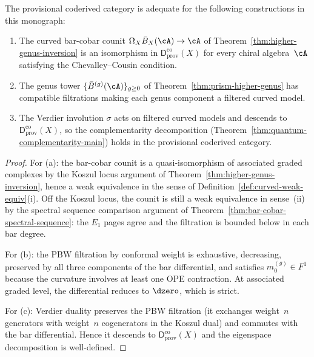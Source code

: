 \begin{proposition}
\label{prop:coderived-adequacy}
The provisional coderived category is adequate for the following
constructions in this monograph:
\begin{enumerate}[label=\textup{(\alph*)}]
\item The curved bar-cobar counit
  $\Omega_X \bar{B}_X(\cA) \to \cA$ of
  Theorem~\textup{\ref{thm:higher-genus-inversion}} is an isomorphism
  in $\mathsf{D}^{\mathrm{co}}_{\mathrm{prov}}(X)$ for every chiral
  algebra~$\cA$ satisfying the Chevalley--Cousin condition.
\item The genus tower $\{\bar{B}^{(g)}(\cA)\}_{g \geq 0}$ of
  Theorem~\textup{\ref{thm:prism-higher-genus}} has compatible
  filtrations making each genus component a filtered curved model.
\item The Verdier involution $\sigma$ acts on filtered curved models
  and descends to $\mathsf{D}^{\mathrm{co}}_{\mathrm{prov}}(X)$,
  so the complementarity decomposition
  \textup{(}Theorem~\textup{\ref{thm:quantum-complementarity-main})}
  holds in the provisional coderived category.
\end{enumerate}
\end{proposition}

\begin{proof}
For (a): the bar-cobar counit is a quasi-isomorphism of associated
graded complexes by the Koszul locus argument of
Theorem~\ref{thm:higher-genus-inversion}, hence a weak equivalence
in the sense of Definition~\ref{def:curved-weak-equiv}(i).
Off the Koszul locus, the counit is still a weak equivalence
in sense~(ii) by the spectral sequence comparison argument of
Theorem~\ref{thm:bar-cobar-spectral-sequence}: the $E_1$ pages agree
and the filtration is bounded below in each bar degree.

For (b): the PBW filtration by conformal weight is exhaustive,
decreasing, preserved by all three components of the bar differential,
and satisfies $m_0^{(g)} \in F^1$ because the curvature involves at
least one OPE contraction.  At associated graded level, the
differential reduces to $\dzero$, which is strict.

For (c): Verdier duality preserves the PBW filtration
(it exchanges weight~$n$ generators with weight~$n$ cogenerators in
the Koszul dual) and commutes with the bar differential.  Hence it
descends to $\mathsf{D}^{\mathrm{co}}_{\mathrm{prov}}(X)$ and the
eigenspace decomposition is well-defined.
\end{proof}

